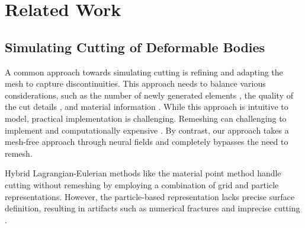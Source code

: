 \section{Related Work}

\subsection{Simulating Cutting of Deformable Bodies}

A common approach towards simulating cutting is refining and adapting the mesh to capture discontinuities. This approach needs to balance various considerations, such as the number of newly generated elements \cite{Bielser:2000:ISSC, Mor:2000:MSTM}, the quality of the cut details \cite{Busaryev:2013:AFS}, and material information \cite{Chen:2014:refine}. While this approach is intuitive to model, practical implementation is challenging. Remeshing can challenging to implement \cite{zhang2019amrex} and computationally expensive \cite{obiols2023adarnet}. By contrast, our approach takes a mesh-free approach through neural fields and completely bypasses the need to remesh.

Hybrid Lagrangian-Eulerian methods like the material point method \cite{jiang2016material} handle cutting without remeshing by employing a combination of grid and particle representations. However, the particle-based representation lacks precise surface definition, resulting in artifacts such as numerical fractures and imprecise cutting \cite{su2022ulmpm,fan2025hybrid}.



